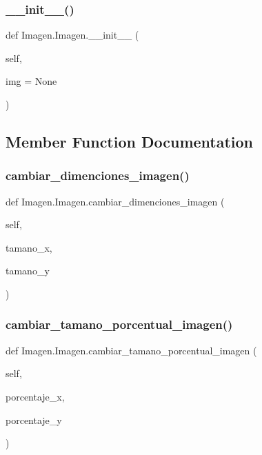 \subsubsection{\texorpdfstring{\+\_\+\+\_\+init\+\_\+\+\_\+()}{\_\_init\_\_()}}
{\footnotesize\ttfamily def Imagen.\+Imagen.\+\_\+\+\_\+init\+\_\+\+\_\+ (\begin{DoxyParamCaption}\item[{}]{self,  }\item[{}]{img = {\ttfamily None} }\end{DoxyParamCaption})}



\subsection{Member Function Documentation}
\mbox{\label{class_imagen_1_1_imagen_a6af5c7d6010936e477afa8bb52a4e2a6}} 
\subsubsection{\texorpdfstring{cambiar\+\_\+dimenciones\+\_\+imagen()}{cambiar\_dimenciones\_imagen()}}
{\footnotesize\ttfamily def Imagen.\+Imagen.\+cambiar\+\_\+dimenciones\+\_\+imagen (\begin{DoxyParamCaption}\item[{}]{self,  }\item[{}]{tamano\+\_\+x,  }\item[{}]{tamano\+\_\+y }\end{DoxyParamCaption})}

\mbox{\label{class_imagen_1_1_imagen_a5e3ac172693ba05dc2784b8ed4dccf0b}} 
\subsubsection{\texorpdfstring{cambiar\+\_\+tamano\+\_\+porcentual\+\_\+imagen()}{cambiar\_tamano\_porcentual\_imagen()}}
{\footnotesize\ttfamily def Imagen.\+Imagen.\+cambiar\+\_\+tamano\+\_\+porcentual\+\_\+imagen (\begin{DoxyParamCaption}\item[{}]{self,  }\item[{}]{porcentaje\+\_\+x,  }\item[{}]{porcentaje\+\_\+y }\end{DoxyParamCaption})}

